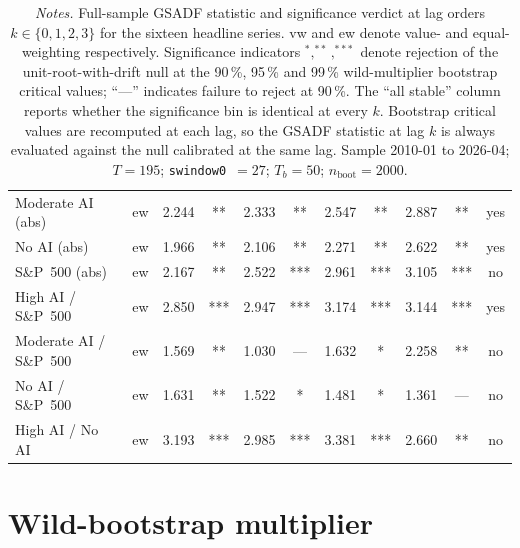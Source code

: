 \begin{table}[t]
\begin{tabular}{l c S[table-format=1.3] c S[table-format=1.3] c S[table-format=1.3] c S[table-format=1.3] c c}
Moderate AI (abs)          & ew & 2.244 & **  & 2.333 & **  & 2.547 & **  & 2.887 & **  & yes \\
No AI (abs)                & ew & 1.966 & **  & 2.106 & **  & 2.271 & **  & 2.622 & **  & yes \\
S\&P~500 (abs)             & ew & 2.167 & **  & 2.522 & *** & 2.961 & *** & 3.105 & *** & no  \\
High AI / S\&P~500         & ew & 2.850 & *** & 2.947 & *** & 3.174 & *** & 3.144 & *** & yes \\
Moderate AI / S\&P~500     & ew & 1.569 & **  & 1.030 & --- & 1.632 & *   & 2.258 & **  & no  \\
No AI / S\&P~500           & ew & 1.631 & **  & 1.522 & *   & 1.481 & *   & 1.361 & --- & no  \\
High AI / No AI            & ew & 3.193 & *** & 2.985 & *** & 3.381 & *** & 2.660 & **  & no  \\
\bottomrule
\end{tabular}
\caption*{\footnotesize \textit{Notes.} Full-sample GSADF statistic and significance verdict at lag orders $k\in\{0,1,2,3\}$ for the sixteen headline series. vw and ew denote value- and equal-weighting respectively. Significance indicators $^{*}, ^{**}, ^{***}$ denote rejection of the unit-root-with-drift null at the 90\,\%, 95\,\% and 99\,\% wild-multiplier bootstrap critical values; ``---'' indicates failure to reject at 90\,\%. The ``all stable'' column reports whether the significance bin is identical at every $k$. Bootstrap critical values are recomputed at each lag, so the GSADF statistic at lag $k$ is always evaluated against the null calibrated at the same lag. Sample 2010-01 to 2026-04; $T = \num{195}$; \texttt{swindow0}~$=27$; $T_b=50$; $n_{\mathrm{boot}} = \num{2000}$.}
\end{table}


\section{Wild-bootstrap multiplier}
\label{sec:rob-wild}

